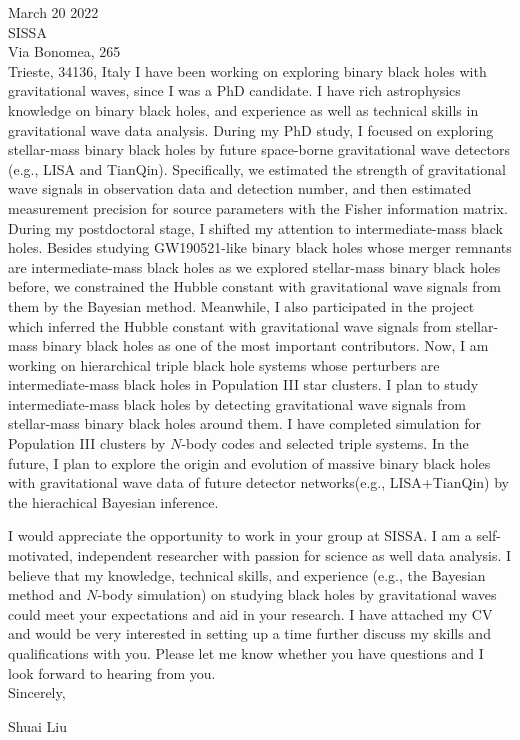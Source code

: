\documentclass[11pt,a4paper,sans]{letter} %
\begin{document}
\begin{letter}{March 20 2022 \\
SISSA \\
Via Bonomea, 265 \\ 
Trieste, 34136, Italy}
I have been working on exploring binary black holes with gravitational waves, since I was a PhD candidate. I
    have rich astrophysics knowledge on binary black holes, and experience as well as technical skills in gravitational wave data analysis. During my PhD study, I focused on exploring stellar-mass binary black holes by future
    space-borne gravitational wave detectors (e.g., LISA and TianQin). Specifically, we estimated the strength of
    gravitational wave signals in observation data and detection number, and then estimated
    measurement precision for source parameters with the Fisher information matrix. During my postdoctoral stage, I shifted
    my attention to intermediate-mass black holes. Besides studying GW190521-like binary black holes whose merger remnants are
    intermediate-mass black holes as we explored stellar-mass binary black holes before, we constrained the
    Hubble constant with gravitational wave signals from them by the Bayesian method. Meanwhile, I also participated
    in the project which inferred the Hubble
    constant with gravitational wave signals from stellar-mass binary black holes as one of the most important
    contributors. Now, I am working on
    hierarchical triple
    black hole systems whose perturbers are intermediate-mass black holes in Population III star clusters. I plan to
    study intermediate-mass black holes by detecting gravitational wave signals from stellar-mass binary black holes
    around them. I have completed simulation for Population III
    clusters by $N$-body codes and selected triple systems.  
    In the future, I plan to explore the origin and evolution of massive binary black holes with gravitational wave
    data of future detector networks(e.g., LISA+TianQin) by the hierachical Bayesian inference.

I would appreciate the opportunity to work in your group at SISSA. I am a self-motivated, independent researcher with
    passion for science as well data analysis. I believe that my knowledge,
    technical skills, and experience (e.g., the Bayesian method and $N$-body simulation) on studying black holes by
    gravitational waves could meet your expectations and aid in your research. I have attached my CV and would be very interested in setting up a time further
discuss my skills and qualifications with you. Please let me know whether you have questions and I look forward to
hearing from you.\\

Sincerely,

Shuai Liu




\end{letter}
\end{document}
